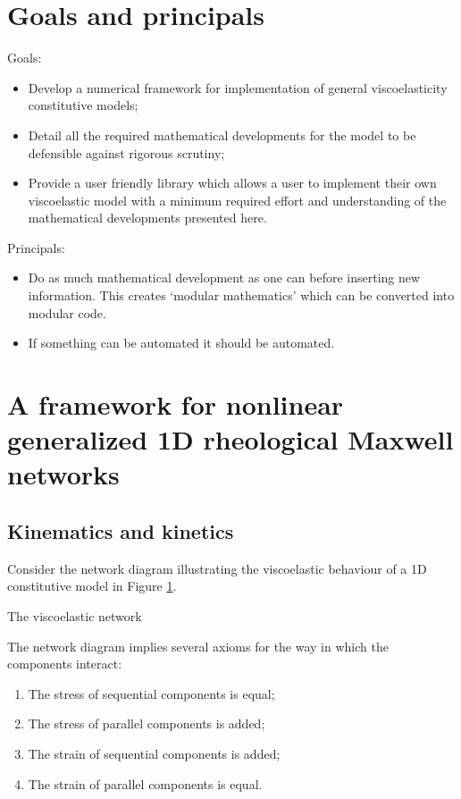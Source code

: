 \documentclass[12pt]{article}
\begin{document}
\section{Goals and principals}

Goals:
\begin{itemize}
	\item Develop a numerical framework for implementation of general viscoelasticity constitutive models;
	\item Detail all the required mathematical developments for the model to be defensible against rigorous scrutiny;
	\item Provide a user friendly library which allows a user to implement their own viscoelastic model with a minimum required effort and understanding of the mathematical developments presented here.
\end{itemize}

Principals:
\begin{itemize}
	\item Do as much mathematical development as one can before inserting new information. This creates `modular mathematics' which can be converted into modular code.
	\item If something can be automated it should be automated.
\end{itemize}

\section{A framework for nonlinear generalized 1D rheological Maxwell networks}

\subsection{Kinematics and kinetics}
Consider the network diagram illustrating the viscoelastic behaviour of a 1D constitutive model in Figure \ref{fig:network-diagram}.
\begin{figure}[!htb]
	\centering
	\caption{ }
	\label{fig:network-diagram}
\end{figure}
The viscoelastic network 

The network diagram implies several axioms for the way in which the components interact:
\begin{enumerate}
	\item The stress of sequential components is equal;
	\item The stress of parallel components is added;
	\item The strain of sequential components is added;
	\item The strain of parallel components is equal.
\end{enumerate} 
\end{document}
